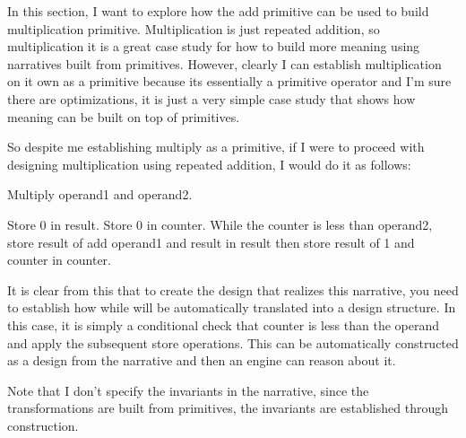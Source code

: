 In this section, I want to explore how the add primitive can be used to build multiplication primitive. Multiplication is just repeated addition, so multiplication it is a great case study for how to build more meaning using narratives built from primitives. However, clearly I can establish multiplication on it own as a primitive because its essentially a primitive operator and I'm sure there are optimizations, it is just a very simple case study that shows how meaning can be built on top of primitives.

So despite me establishing multiply as a primitive, if I were to proceed with designing multiplication using repeated addition, I would do it as follows:

\begin{greyquote}
Multiply {operand1} and {operand2}.
\end{greyquote}

\begin{greyquote}
Store 0 in result. Store 0 in counter. While the counter is less than operand2, store result of add operand1 and result in result then store result of 1 and counter in counter.
\end{greyquote}

It is clear from this that to create the design that realizes this narrative, you need to establish how while will be automatically translated into a design structure. In this case, it is simply a conditional check that counter is less than the operand and apply the subsequent store operations. This can be automatically constructed as a design from the narrative and then an engine can reason about it.

Note that I don't specify the invariants in the narrative, since the transformations are built from primitives, the invariants are established through construction.
